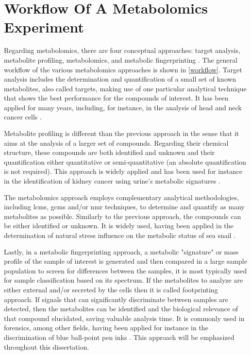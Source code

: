 
\section{Workflow Of A Metabolomics Experiment}

Regarding metabolomics, there are four conceptual approaches: target analysis, metabolite profiling,  metabolomics, and metabolic fingerprinting \citep{roessner2009metabolomics}. The general workflow of the various metabolomics approaches is shown in \autoref{workflow}. Target analysis includes the determination and quantification of a small set of known metabolites, also called targets, making use of one particular analytical technique that shows the best performance for the compounds of interest. It has been applied for many years, including, for instance, in the analysis of head and neck cancer cells \citep{hu2015targeted}.

Metabolite profiling is different than the previous approach in the sense that it aims at the analysis of a larger set of compounds. Regarding their chemical structure, these compounds are both identified and unknown and their quantification either quantitative or semi-quantitative (an absolute quantification is not required). This approach is widely applied and has been used for instance in the identification of kidney cancer using urine's metabolic signatures \citep{kind2007comprehensive}.

The metabolomics approach employs complementary analytical methodologies, including \gls{lcms}, \gls{gcms} and/or \gls{nmr} techniques, to determine and quantify as many metabolites as possible. Similarly to the previous approach, the compounds can be either identified or unknown. It is widely used, having been applied in the determination of natural stress influence on the metabolic status of sea snail \citep{rosenblum2005characterizing}.

Lastly, in a metabolic fingerprinting approach, a metabolic "signature" or mass profile of the sample of interest is generated and then compared in a large sample population to screen for differences between the samples, it is most typically used for sample classification based on its spectrum. If the metabolites to analyze are either external and/or secreted by the cells then it is called footprinting approach. If signals that can significantly discriminate between samples are detected, then the metabolites can be identified and the biological relevance of that compound elucidated, saving valuable analysis time. It is commonly used in forensics, among other fields, having been applied for instance in the discrimination of blue ball-point pen inks \citep{thanasoulias2003multivariate}. This approach will be emphasized throughout this dissertation.

